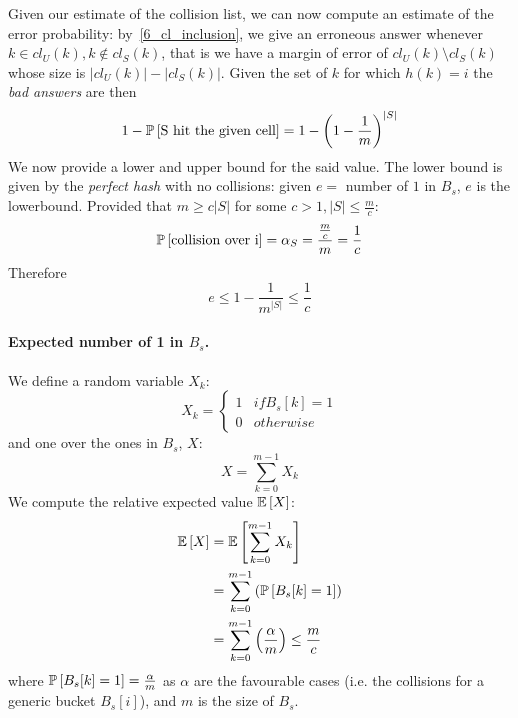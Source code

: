 Given our estimate of the collision list, we can now compute an estimate of the error probability: by~\ref{6_cl_inclusion}, we give an erroneous answer whenever $k \in cl_{U}(k), k \notin cl_{S}(k)$, that is we have a margin of error of $cl_{U}(k) \setminus cl_{S}(k)$ whose size is $|cl_{U}(k)| - |cl_{S}(k)|$.
Given the set of $k$ for which $h(k) = i$ the \emph{bad answers} are then
    \begin{equation}
    1 - \operatorname*{\mathbb{P}}\left[{\textrm{S hit the given cell}}\right] = 1 - \left(1 - \frac{1}{m}\right)^{|S|}
    \end{equation}
We now provide a lower and upper bound for the said value.
The lower bound is given by the \emph{perfect hash} with no collisions: given
$e = $ number of $1$ in $B_s$, $e$ is the lowerbound.
Provided that  $m \geq c |S|$ for some $c > 1, |S| \leq \frac{m}{c}$:
    \begin{equation}
    \operatorname*{\mathbb{P}}\left[{\textrm{collision over i}}\right] = \alpha_{S} = \frac{\frac{m}{c}}{m} = \frac{1}{c}
    \end{equation}
Therefore
    \begin{equation}
    e \leq 1 - \frac{1}{m^{|S|}} \leq \frac{1}{c}
    \end{equation}

\paragraph{Expected number of 1 in $B_{s}$.}
We define a random variable $X_{k}$:
    \begin{equation*}
    X_{k} = \begin{cases}
            1   & if B_{s}[k] = 1  \\
            0   & otherwise
            \end{cases}
    \end{equation*}
and one over the ones in $B_{s}$, $X$:
    \begin{equation}
        X = \sum_{k = 0}^{m - 1}X_k
    \end{equation}
We compute the relative expected value $\mathbb{E}\left[{X}\right]$:
    \begin{align*}
       \mathbb{E}\left[{X}\right] & = \mathbb{E}\left[{\sum_{k = 0}^{m - 1}X_k}\right] \\
       & = \sum_{k = 0}^{m - 1} \left( \operatorname*{\mathbb{P}}\left[{B_{s}[k] = 1}\right] \right) \\
       & = \sum_{k = 0}^{m - 1} \left( \frac{\alpha}{m}\right) \leq \frac{m}{c}
   \end{align*}
where $\operatorname*{\mathbb{P}}\left[{B_{s}[k] = 1}\right] = \frac{\alpha}{m}$ as $\alpha$ are the favourable cases
(i.e. the collisions for a generic bucket $B_s[i]$), and $m$ is the size of $B_s$.